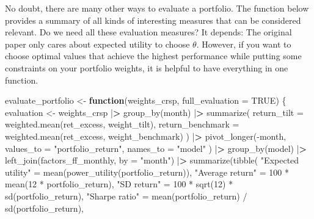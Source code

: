 \documentclass[
]{book}
\newenvironment{Shaded}{\begin{snugshade}}{\end{snugshade}}
\newcommand{\AttributeTok}[1]{\textcolor[rgb]{0.61,0.61,0.61}{#1}}
\newcommand{\ConstantTok}[1]{\textcolor[rgb]{0,0,0}{#1}}
\newcommand{\ControlFlowTok}[1]{\textcolor[rgb]{0.27,0.27,0.27}{\textbf{#1}}}
\newcommand{\DecValTok}[1]{\textcolor[rgb]{0.06,0.06,0.06}{#1}}
\newcommand{\ErrorTok}[1]{\textcolor[rgb]{0.14,0.14,0.14}{\textbf{#1}}}
\newcommand{\FunctionTok}[1]{\textcolor[rgb]{0,0,0}{#1}}
\newcommand{\NormalTok}[1]{#1}
\newcommand{\OtherTok}[1]{\textcolor[rgb]{0.37,0.37,0.37}{#1}}
\newcommand{\SpecialCharTok}[1]{\textcolor[rgb]{0,0,0}{#1}}
\newcommand{\StringTok}[1]{\textcolor[rgb]{0.5,0.5,0.5}{#1}}
\begin{document}
No doubt, there are many other ways to evaluate a portfolio. The function below provides a summary of all kinds of interesting measures that can be considered relevant. Do we need all these evaluation measures? It depends: The original paper \citet{Brandt2009} only cares about expected utility to choose \(\theta\). However, if you want to choose optimal values that achieve the highest performance while putting some constraints on your portfolio weights, it is helpful to have everything in one function.

\begin{Shaded}
\begin{Highlighting}[]
\NormalTok{evaluate\_portfolio }\OtherTok{\textless{}{-}} \ControlFlowTok{function}\NormalTok{(weights\_crsp,}
                               \AttributeTok{full\_evaluation =} \ConstantTok{TRUE}\NormalTok{) \{}
\NormalTok{  evaluation }\OtherTok{\textless{}{-}}\NormalTok{ weights\_crsp }\SpecialCharTok{|}\ErrorTok{\textgreater{}}
    \FunctionTok{group\_by}\NormalTok{(month) }\SpecialCharTok{|}\ErrorTok{\textgreater{}}
    \FunctionTok{summarize}\NormalTok{(}
      \AttributeTok{return\_tilt =} \FunctionTok{weighted.mean}\NormalTok{(ret\_excess, weight\_tilt),}
      \AttributeTok{return\_benchmark =} \FunctionTok{weighted.mean}\NormalTok{(ret\_excess, weight\_benchmark)}
\NormalTok{    ) }\SpecialCharTok{|}\ErrorTok{\textgreater{}}
    \FunctionTok{pivot\_longer}\NormalTok{(}\SpecialCharTok{{-}}\NormalTok{month,}
      \AttributeTok{values\_to =} \StringTok{"portfolio\_return"}\NormalTok{,}
      \AttributeTok{names\_to =} \StringTok{"model"}
\NormalTok{    ) }\SpecialCharTok{|}\ErrorTok{\textgreater{}}
    \FunctionTok{group\_by}\NormalTok{(model) }\SpecialCharTok{|}\ErrorTok{\textgreater{}}
    \FunctionTok{left\_join}\NormalTok{(factors\_ff\_monthly, }\AttributeTok{by =} \StringTok{"month"}\NormalTok{) }\SpecialCharTok{|}\ErrorTok{\textgreater{}}
    \FunctionTok{summarize}\NormalTok{(}\FunctionTok{tibble}\NormalTok{(}
      \StringTok{"Expected utility"} \OtherTok{=} \FunctionTok{mean}\NormalTok{(}\FunctionTok{power\_utility}\NormalTok{(portfolio\_return)),}
      \StringTok{"Average return"} \OtherTok{=} \DecValTok{100} \SpecialCharTok{*} \FunctionTok{mean}\NormalTok{(}\DecValTok{12} \SpecialCharTok{*}\NormalTok{ portfolio\_return),}
      \StringTok{"SD return"} \OtherTok{=} \DecValTok{100} \SpecialCharTok{*} \FunctionTok{sqrt}\NormalTok{(}\DecValTok{12}\NormalTok{) }\SpecialCharTok{*} \FunctionTok{sd}\NormalTok{(portfolio\_return),}
      \StringTok{"Sharpe ratio"} \OtherTok{=} \FunctionTok{mean}\NormalTok{(portfolio\_return) }\SpecialCharTok{/} \FunctionTok{sd}\NormalTok{(portfolio\_return),}

\end{Highlighting}
\end{Shaded}
\end{document}
